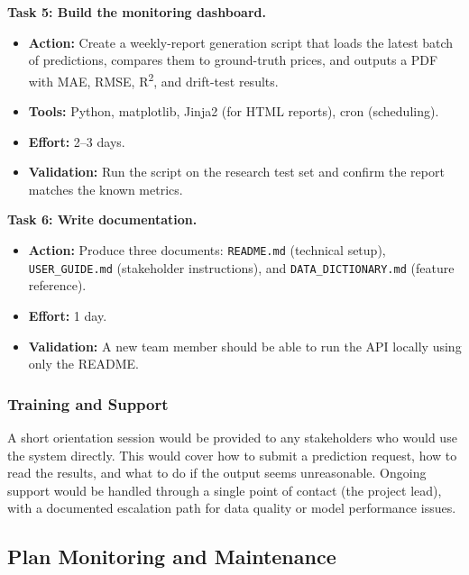 \medskip\noindent
\textbf{Task 5: Build the monitoring dashboard.}
\vspace{-9pt}
\begin{itemize}[itemsep=-9pt]
    \item \textbf{Action:} Create a weekly-report generation script that loads the latest batch of predictions, compares them to ground-truth prices, and outputs a PDF with MAE, RMSE, R\textsuperscript{2}, and drift-test results.
    \item \textbf{Tools:} Python, matplotlib, Jinja2 (for HTML reports), cron (scheduling).
    \item \textbf{Effort:} 2--3 days.
    \item \textbf{Validation:} Run the script on the research test set and confirm the report matches the known metrics.
\end{itemize}

\medskip\noindent
\textbf{Task 6: Write documentation.}
\vspace{-9pt}
\begin{itemize}[itemsep=-9pt]
    \item \textbf{Action:} Produce three documents: \texttt{README.md} (technical setup), \texttt{USER\_GUIDE.md} (stakeholder instructions), and \texttt{DATA\_DICTIONARY.md} (feature reference).
    \item \textbf{Effort:} 1 day.
    \item \textbf{Validation:} A new team member should be able to run the API locally using only the README.
\end{itemize}

\subsubsection{Training and Support}

\noindent
A short orientation session would be provided to any stakeholders who would use the system directly. This would cover how to submit a prediction request, how to read the results, and what to do if the output seems unreasonable. Ongoing support would be handled through a single point of contact (the project lead), with a documented escalation path for data quality or model performance issues.

\subsection{Plan Monitoring and Maintenance}
\label{subsec:Plan Monitoring and Maintenance}

